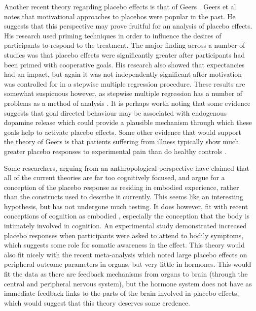 Another recent theory regarding placebo effects is that of Geers \cite{Geers2005a}. Geers et al notes that  motivational approaches to placebos were popular in the past.  He suggests that this perspective may prove fruitful for an analysis of placebo effects.   His research used priming techniques in order to influence the desires of  participants to respond to the treatment. 
The major finding across a number of studies \cite{Geers2007,Geers2005a} was that placebo effects were significantly greater after participants had been primed with cooperative goals. His research also showed that expectancies had an impact, but again it was not independently significant after motivation was controlled for in a stepwise multiple regression procedure. These results are somewhat suspicuous however, as stepwise multiple regression has a number of problems as a method of analysis \cite{antonakis2010looking}.   It is perhaps worth noting that some evidence suggests that goal directed behaviour may be associated with endogenous dopamine release \cite{Scott2007a} which could provide a plausible mechanism through which these goals help to activate placebo effects. Some other evidence that would support the theory of Geers is that patients suffering from illness typically show much greater placebo responses to experimental pain than do healthy controls \cite{Klinger2007a}.

Some researchers, arguing from an anthropological perspective \cite{Thompson2009}  have claimed that all of the current theories are far too cognitively focused, and argue for a conception of the placebo response as residing in embodied experience, rather than the constructs used to describe it currently. This seems like an interesting hypothesis, but has not undergone much testing. It does however, fit with recent conceptions of cognition as embodied \cite{wilson2002six}, especially the conception that the body is intimately involved in cognition.   An experimental study \cite{Geers2006} demonstrated increased placebo responses when participants were asked to attend to bodily symptoms, which suggests some role for somatic awareness in the effect. This theory would also fit nicely with the recent meta-analysis \cite{Meissner2007} which noted large placebo effects on peripheral outcome parameters in organs, but very little in hormones. This would fit the data as there are feedback mechanisms from organs to brain (through the central and peripheral nervous system), but the hormone system does not have as immediate feedback links to the parts of the brain involved in placebo effects, which would suggest that this theory deserves some credence. 

